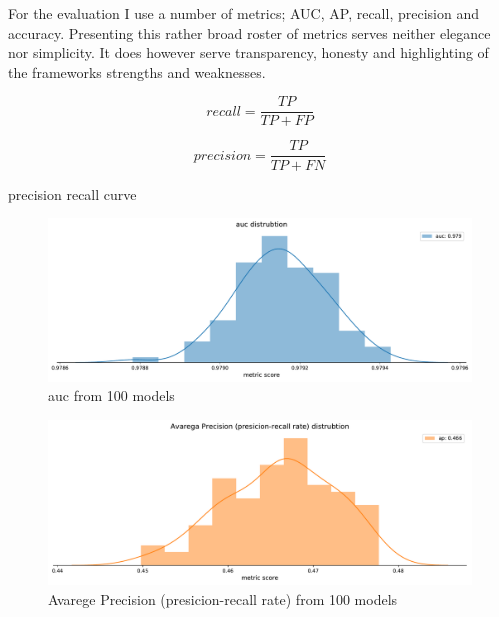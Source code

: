 \documentclass[a4paper]{article}
\begin{document}

For the evaluation I use a number of metrics; AUC, AP, recall, precision and accuracy. Presenting this rather broad roster of metrics serves neither elegance nor simplicity. It does however serve transparency, honesty and highlighting of the frameworks strengths and weaknesses.

\cite[1277]{He_2008}

$$
recall = \frac{TP}{TP+FP}
$$

$$
precision = \frac{TP}{TP+FN}
$$

precision recall curve \cite[1278]{He_2008}




\begin{figure}[!htb]
	\centering
	\includegraphics[scale=0.4]{auc_out_20.pdf}
    \caption{\footnotesize{auc from 100 models}}%
\end{figure}



\begin{figure}[!htb]
	\centering
	\includegraphics[scale=0.4]{ap_out_20.pdf}
    \caption{\footnotesize{Avarege Precision (presicion-recall rate) from 100 models}}%
\end{figure}
\end{document}
